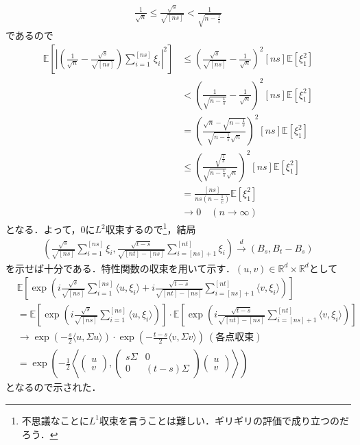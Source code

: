 \documentclass[dvipdfmx]{jsarticle}
\begin{document}
\begin{description}
\begin{align*}
\frac{1}{\sqrt{n}}\leq \frac{\sqrt{s}}{\sqrt{[ns]}}<\frac{1}{\sqrt{n-\frac{1}{s}}}
\end{align*}
であるので
\begin{align*}
\mathbb{E}\left[\left|\left(\frac{1}{\sqrt{n}}-\frac{\sqrt{s}}{\sqrt{[ns]}}\right)\sum_{i=1}^{[ns]}\xi_i\right|^2\right]
&\leq \left(\frac{\sqrt{s}}{\sqrt{[ns]}}-\frac{1}{\sqrt{n}}\right)^2[ns]\mathbb{E}[\xi_1^2] \\
&<\left(\frac{1}{\sqrt{n-\frac{1}{s}}}-\frac{1}{\sqrt{n}}\right)^2[ns]\mathbb{E}[\xi_1^2] \\
&=\left(\frac{\sqrt{n}-\sqrt{n-\frac{1}{s}}}{\sqrt{n-\frac{1}{s}}\sqrt{n}}\right)^2[ns]\mathbb{E}[\xi_1^2] \\
&\leq \left(\frac{\sqrt{\frac{1}{s}}}{\sqrt{n-\frac{1}{s}}\sqrt{n}}\right)^2[ns]\mathbb{E}[\xi_1^2] \\
&=\frac{[ns]}{ns\left(n-\frac{1}{c}\right)}\mathbb{E}[\xi_1^2] \\
&\to 0 \quad (n\to\infty)
\end{align*}
となる．よって，$0$に$L^2$収束するので\footnote{不思議なことに$L^1$収束を言うことは難しい．ギリギリの評価で成り立つのだろう．}，結局
\begin{align*}
\left(\frac{\sqrt{s}}{\sqrt{[ns]}}\sum_{i=1}^{[ns]}\xi_i,\frac{\sqrt{t-s}}{\sqrt{[nt]-[ns]}}\sum_{i=[ns]+1}^{[nt]}\xi_i\right)
\overset{d}{\to}(B_s,B_t-B_s)
\end{align*}
を示せば十分である．特性関数の収束を用いて示す．$(u,v)\in\mathbb{R}^d\times\mathbb{R}^d$として
\begin{align*}
&\mathbb{E}\left[
\exp\left(
i\frac{\sqrt{s}}{\sqrt{[ns]}}\sum_{i=1}^{[ns]}\langle u,\xi_i\rangle+i\frac{\sqrt{t-s}}{\sqrt{[nt]-[ns]}}\sum_{i=[ns]+1}^{[nt]}\langle v,\xi_i\rangle
\right)
\right] \\
&=\mathbb{E}\left[
\exp\left(
i\frac{\sqrt{s}}{\sqrt{[ns]}}\sum_{i=1}^{[ns]}\langle u,\xi_i\rangle
\right)
\right]
\cdot\mathbb{E}\left[
\exp\left(
i\frac{\sqrt{t-s}}{\sqrt{[nt]-[ns]}}\sum_{i=[ns]+1}^{[nt]}\langle v,\xi_i\rangle
\right)
\right] \\
&\to \exp{\left(-\frac{s}{2}\langle u,\Sigma u\rangle\right)}
\cdot\exp{\left(-\frac{t-s}{2}\langle v,\Sigma v\rangle\right)} {\ } (各点収束) \\
&=\exp{\left(
-\frac{1}{2}\left\langle
\begin{pmatrix}
u \\
v
\end{pmatrix}
,
\begin{pmatrix}
s\Sigma & 0 \\
0 & (t-s)\Sigma
\end{pmatrix}
\begin{pmatrix}
u \\
v
\end{pmatrix}
\right\rangle
\right)}
\end{align*}
となるので示された．
\end{description}
%
%
%
%
\end{document}
